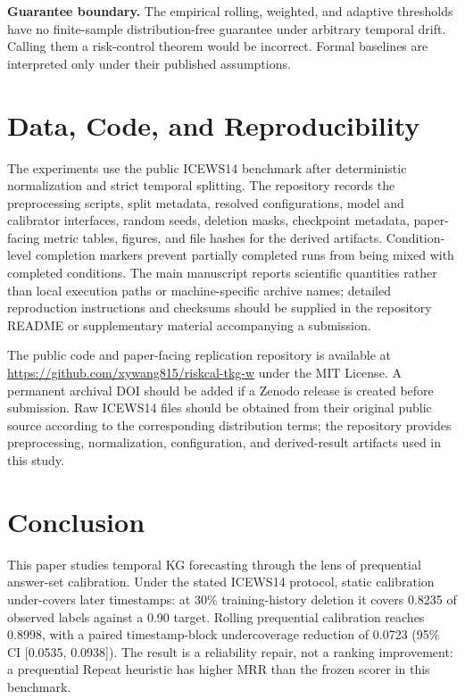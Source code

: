 \documentclass[10pt,twocolumn]{article}
\begin{document}
\textbf{Guarantee boundary.}
The empirical rolling, weighted, and adaptive thresholds have no finite-sample
distribution-free guarantee under arbitrary temporal drift. Calling them a
risk-control theorem would be incorrect. Formal baselines are interpreted only
under their published assumptions.

\section{Data, Code, and Reproducibility}
\label{sec:reproducibility}

The experiments use the public ICEWS14 benchmark after deterministic
normalization and strict temporal splitting. The repository records the
preprocessing scripts, split metadata, resolved configurations, model and
calibrator interfaces, random seeds, deletion masks, checkpoint metadata,
paper-facing metric tables, figures, and file hashes for the derived artifacts.
Condition-level completion markers prevent partially completed runs from being
mixed with completed conditions. The main manuscript reports scientific
quantities rather than local execution paths or machine-specific archive names;
detailed reproduction instructions and checksums should be supplied in the
repository README or supplementary material accompanying a submission.

The public code and paper-facing replication repository is available at
\url{https://github.com/xywang815/riskcal-tkg-w} under the MIT License. A
permanent archival DOI should be added if a Zenodo release is created before
submission. Raw ICEWS14 files should be obtained from their original public
source according to the corresponding distribution terms; the repository
provides preprocessing, normalization, configuration, and derived-result
artifacts used in this study.

\section{Conclusion}
\label{sec:conclusion}

This paper studies temporal KG forecasting through the lens of prequential
answer-set calibration. Under the stated ICEWS14 protocol, static calibration
under-covers later timestamps: at 30\% training-history deletion it covers
0.8235 of observed labels against a 0.90 target. Rolling prequential
calibration reaches 0.8998, with a paired timestamp-block undercoverage
reduction of 0.0723 (95\% CI [0.0535, 0.0938]). The result is a reliability
repair, not a ranking improvement: a prequential Repeat heuristic has higher
MRR than the frozen scorer in this benchmark.
\end{document}
